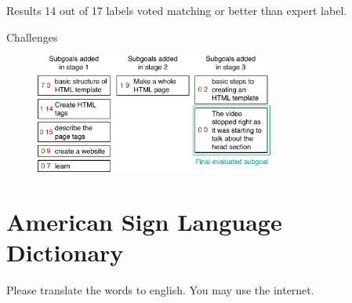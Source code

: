 
	\begin{frame}{Results}
		14 out of 17 labels voted matching or better than expert label.
	\end{frame}

	\begin{frame}{Challenges}
		\begin{figure}
			\centering
			\includegraphics[width=0.7\textwidth]{images/subgoal-worsened}
		\end{figure}
	\end{frame}




\section{American Sign Language Dictionary}

	\begin{frame}[standout]
		Please translate the words to english. You may use the internet.
	\end{frame}


